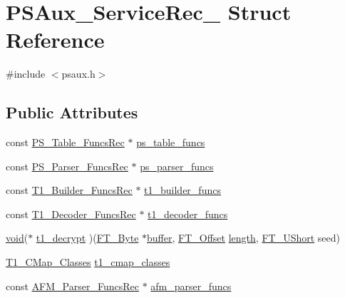 \hypertarget{struct_p_s_aux___service_rec__}{\section{P\-S\-Aux\-\_\-\-Service\-Rec\-\_\- Struct Reference}
\label{struct_p_s_aux___service_rec__}
}


{\ttfamily \#include $<$psaux.\-h$>$}

\subsection*{Public Attributes}
\begin{DoxyCompactItemize}
\item 
const \hyperlink{psaux_8h_a55deb0ed740221275bbe1488d786e5f6}{P\-S\-\_\-\-Table\-\_\-\-Funcs\-Rec} $\ast$ \hyperlink{struct_p_s_aux___service_rec___ad328bf7394cad5b2838822aa109acc42}{ps\-\_\-table\-\_\-funcs}
\item 
const \hyperlink{psaux_8h_a73ccaa98f37bcac7d3e302148011beb6}{P\-S\-\_\-\-Parser\-\_\-\-Funcs\-Rec} $\ast$ \hyperlink{struct_p_s_aux___service_rec___ac673695e814332b38fd33c7f0287a4b7}{ps\-\_\-parser\-\_\-funcs}
\item 
const \hyperlink{psaux_8h_a5f1e6a31991016df7eafdbbff137e3ed}{T1\-\_\-\-Builder\-\_\-\-Funcs\-Rec} $\ast$ \hyperlink{struct_p_s_aux___service_rec___a3fe7449b123d0fb6f7ba92462c4e94c1}{t1\-\_\-builder\-\_\-funcs}
\item 
const \hyperlink{psaux_8h_a0d7708c89277ed537ad307a66814e491}{T1\-\_\-\-Decoder\-\_\-\-Funcs\-Rec} $\ast$ \hyperlink{struct_p_s_aux___service_rec___a5cfe03f55fa4c342a094fd31355835b2}{t1\-\_\-decoder\-\_\-funcs}
\item 
\hyperlink{wglew_8h_aeea6e3dfae3acf232096f57d2d57f084}{void}($\ast$ \hyperlink{struct_p_s_aux___service_rec___a908d3ea91a5c313015bc90568026d57c}{t1\-\_\-decrypt} )(\hyperlink{fttypes_8h_a51f26183ca0c9f4af958939648caeccd}{F\-T\-\_\-\-Byte} $\ast$\hyperlink{fmod_8h_a6c0f527f003707dfaca177b40f406ed9}{buffer}, \hyperlink{fttypes_8h_af7b5edd727ac01b0d4729ac848bd4175}{F\-T\-\_\-\-Offset} \hyperlink{fmod__codec_8h_a921fa83f7755f0139c84ba1831417a2e}{length}, \hyperlink{fttypes_8h_a937f6c17cf5ffd09086d8610c37b9f58}{F\-T\-\_\-\-U\-Short} seed)
\item 
\hyperlink{psaux_8h_a69a7c0a42a1bc1731862770f50a32bc2}{T1\-\_\-\-C\-Map\-\_\-\-Classes} \hyperlink{struct_p_s_aux___service_rec___a4ac30b929dcc6127200baea07b5b406a}{t1\-\_\-cmap\-\_\-classes}
\item 
const \hyperlink{psaux_8h_a40593cf4b8c5b0c179884a3f17af2241}{A\-F\-M\-\_\-\-Parser\-\_\-\-Funcs\-Rec} $\ast$ \hyperlink{struct_p_s_aux___service_rec___a9ddf18cc18487266a3e1dd7721fd12fb}{afm\-\_\-parser\-\_\-funcs}
\end{DoxyCompactItemize}


